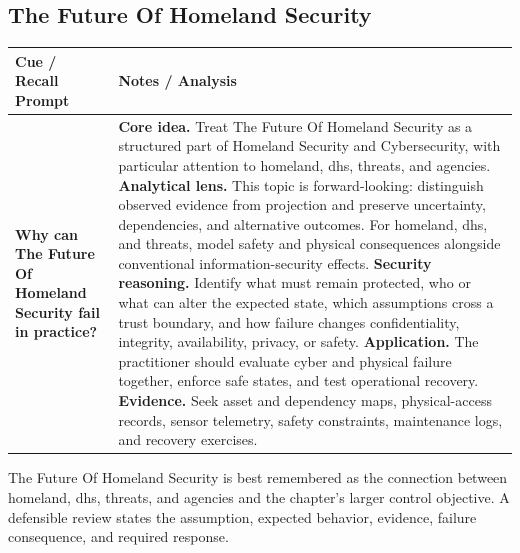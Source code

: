 \documentclass[11pt]{article}
\newcommand{\CornellHeader}{%
\rowcolor{Navy}\color{white}\bfseries Cue / Recall Prompt & \color{white}\bfseries Notes / Analysis\\\hline}
\newcommand{\CornellRow}[2]{%
\cellcolor{CueGray}\RaggedRight\textbf{#1} & \RaggedRight #2\\\hline}
\begin{document}
\subsection*{The Future Of Homeland Security}
\begin{longtable}{>{\RaggedRight\arraybackslash}p{}|>{\RaggedRight\arraybackslash}p{}}
\CornellHeader
\CornellRow{Why can The Future Of Homeland Security fail in practice?}{\textbf{Core idea.} Treat The Future Of Homeland Security as a structured part of Homeland Security and Cybersecurity, with particular attention to homeland, dhs, threats, and agencies. \textbf{Analytical lens.} This topic is forward-looking: distinguish observed evidence from projection and preserve uncertainty, dependencies, and alternative outcomes. For homeland, dhs, and threats, model safety and physical consequences alongside conventional information-security effects. \textbf{Security reasoning.} Identify what must remain protected, who or what can alter the expected state, which assumptions cross a trust boundary, and how failure changes confidentiality, integrity, availability, privacy, or safety. \textbf{Application.} The practitioner should evaluate cyber and physical failure together, enforce safe states, and test operational recovery. \textbf{Evidence.} Seek asset and dependency maps, physical-access records, sensor telemetry, safety constraints, maintenance logs, and recovery exercises.}
\end{longtable}
\begin{topicsummary}
The Future Of Homeland Security is best remembered as the connection between homeland, dhs, threats, and agencies and the chapter's larger control objective. A defensible review states the assumption, expected behavior, evidence, failure consequence, and required response.
\end{topicsummary}
\end{document}
